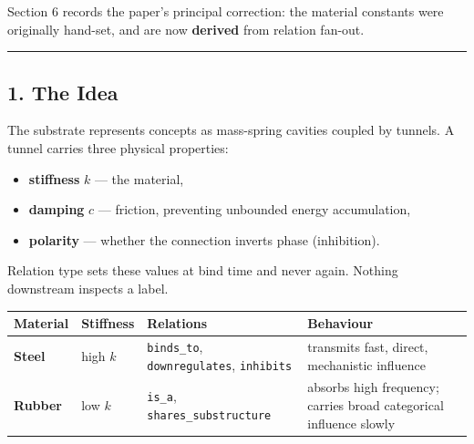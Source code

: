 \documentclass[
  11pt,
  a4paper,
]{article}
\providecommand{\tightlist}{%
  \setlength{\itemsep}{0pt}\setlength{\parskip}{0pt}}
\begin{document}
Section 6 records the paper's principal correction: the material
constants were originally hand-set, and are now \textbf{derived} from
relation fan-out.

\begin{center}\rule{0.5\linewidth}{0.5pt}\end{center}

\subsection{1. The Idea}\label{the-idea}

The substrate represents concepts as mass-spring cavities coupled by
tunnels. A tunnel carries three physical properties:

\begin{itemize}
\tightlist
\item
  \textbf{stiffness} \(k\) --- the material,
\item
  \textbf{damping} \(c\) --- friction, preventing unbounded energy
  accumulation,
\item
  \textbf{polarity} --- whether the connection inverts phase
  (inhibition).
\end{itemize}

Relation type sets these values at bind time and never again. Nothing
downstream inspects a label.

\begin{longtable}[]{@{}
  >{\raggedright\arraybackslash}p{}
  >{\raggedright\arraybackslash}p{}
  >{\raggedright\arraybackslash}p{}
  >{\raggedright\arraybackslash}p{}@{}}
\toprule\noalign{}
\begin{minipage}[b]{\linewidth}\raggedright
Material
\end{minipage} & \begin{minipage}[b]{\linewidth}\raggedright
Stiffness
\end{minipage} & \begin{minipage}[b]{\linewidth}\raggedright
Relations
\end{minipage} & \begin{minipage}[b]{\linewidth}\raggedright
Behaviour
\end{minipage} \\
\midrule\noalign{}
\endhead
\bottomrule\noalign{}
\endlastfoot
\textbf{Steel} & high \(k\) & \texttt{binds\_to},
\texttt{downregulates}, \texttt{inhibits} & transmits fast, direct,
mechanistic influence \\
\textbf{Rubber} & low \(k\) & \texttt{is\_a},
\texttt{shares\_substructure} & absorbs high frequency; carries broad
categorical influence slowly \\
\end{longtable}
\end{document}
